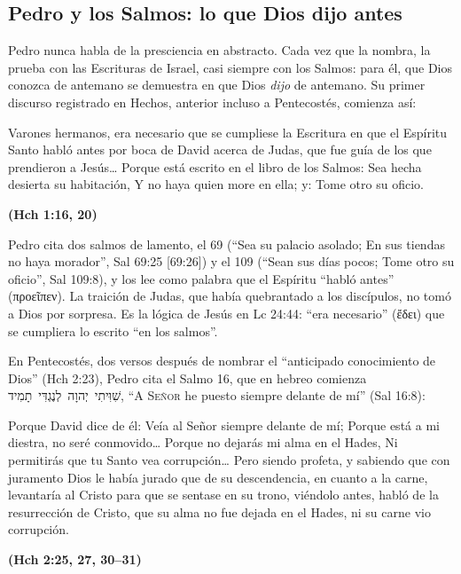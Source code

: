 \documentclass[11pt,letterpaper]{article}
\newcommand{\heb}[1]{\mbox{\foreignlanguage{hebrew}{#1}}}
\newcommand{\grc}[1]{\foreignlanguage{ancientgreek}{#1}}
\newcommand{\SENOR}{\textsc{Señor}}
\newcommand{\fuente}[1]{\par\hfill{\upshape\bfseries\small\textcolor{azul}{#1}}}
\begin{document}
\subsection{Pedro y los Salmos: lo que Dios dijo antes}
Pedro nunca habla de la presciencia en abstracto. Cada vez que la nombra, la prueba con las Escrituras de Israel, casi siempre con los Salmos: para él, que Dios conozca de antemano se demuestra en que Dios \emph{dijo} de antemano. Su primer discurso registrado en Hechos, anterior incluso a Pentecostés, comienza así:

\begin{cita}Varones hermanos, era necesario que se cumpliese la Escritura en que el Espíritu Santo habló antes por boca de David acerca de Judas, que fue guía de los que prendieron a Jesús\ldots{} Porque está escrito en el libro de los Salmos: Sea hecha desierta su habitación, Y no haya quien more en ella; y: Tome otro su oficio.\fuente{(Hch 1:16, 20)}\end{cita}

Pedro cita dos salmos de lamento, el 69 (``Sea su palacio asolado; En sus tiendas no haya morador'', Sal 69:25 [69:26]) y el 109 (``Sean sus días pocos; Tome otro su oficio'', Sal 109:8), y los lee como palabra que el Espíritu ``habló antes'' (\grc{προεῖπεν}). La traición de Judas, que había quebrantado a los discípulos, no tomó a Dios por sorpresa. Es la lógica de Jesús en Lc 24:44: ``era necesario'' (\grc{ἔδει}) que se cumpliera lo escrito ``en los salmos''.

En Pentecostés, dos versos después de nombrar el ``anticipado conocimiento de Dios'' (Hch 2:23), Pedro cita el Salmo 16, que en hebreo comienza \heb{שִׁוִּיתִי יְהוָה לְנֶגְדִּי תָמִיד}, ``A \SENOR{} he puesto siempre delante de mí'' (Sal 16:8):

\begin{cita}Porque David dice de él: Veía al Señor siempre delante de mí; Porque está a mi diestra, no seré conmovido\ldots{} Porque no dejarás mi alma en el Hades, Ni permitirás que tu Santo vea corrupción\ldots{} Pero siendo profeta, y sabiendo que con juramento Dios le había jurado que de su descendencia, en cuanto a la carne, levantaría al Cristo para que se sentase en su trono, viéndolo antes, habló de la resurrección de Cristo, que su alma no fue dejada en el Hades, ni su carne vio corrupción.\fuente{(Hch 2:25, 27, 30--31)}\end{cita}
\end{document}
